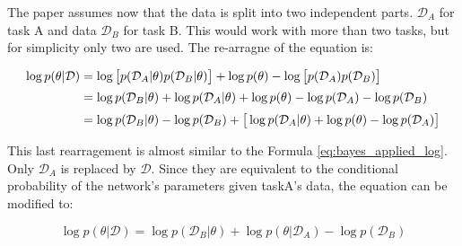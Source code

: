 The paper assumes now that the data is split into two independent parts. $\mathcal{D}_A$ for task A and data $\mathcal{D}_B$ for task B.
This would work with more than two tasks, but for simplicity only two are used.
The re-arragne of the equation is: \cite{elastic-weight-consolidation, schaeffer_ewc}

\begin{equation}
    \setlength{\jot}{5pt}
    \begin{split}
        \log p(\theta | \mathcal{D}) 
        & = \log \big[
                p(\mathcal{D}_A | \theta) p(\mathcal{D}_B | \theta)
                \big]
            + \log p(\theta)
            - \log \big[
                p(\mathcal{D}_A) p(\mathcal{D}_B) 
             \big]
        \\
        & = \log p(\mathcal{D}_B | \theta)
            + \log p(\mathcal{D}_A | \theta)
            + \log p(\theta)
            - \log p(\mathcal{D}_A)
            - \log p(\mathcal{D}_B)
        \\
        & = \log p(\mathcal{D}_B | \theta)
            - \log p(\mathcal{D}_B)
            + \big[
                \log p(\mathcal{D}_A | \theta)
                + \log p(\theta)
                - \log p(\mathcal{D}_A)
                \big]
    \end{split}
\end{equation}

This last rearragement is almost similar to the Formula \eqref{eq:bayes_applied_log}.
Only $\mathcal{D}_A$ is replaced by $\mathcal{D}$.
Since they are equivalent to the conditional probability of the network's parameters given taskA's data, the equation can be modified to: \cite{elastic-weight-consolidation, schaeffer_ewc}

\begin{equation}
    \log p(\theta | \mathcal{D})=
       \log p(\mathcal{D}_B | \theta)
     + \log p(\theta | \mathcal{D}_A)
     - \log p(\mathcal{D}_B)
    \label{eq:bayesian_modified}
\end{equation}

